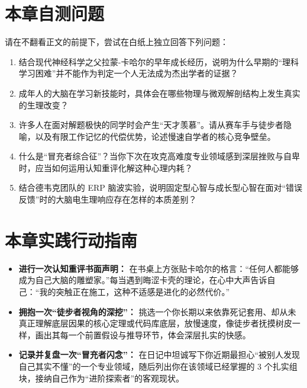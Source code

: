 \documentclass[12pt,a4paper,openany]{ctexbook}
\begin{document}
\section*{本章自测问题}
请在不翻看正文的前提下，尝试在白纸上独立回答下列问题：
\begin{enumerate}
    \item 结合现代神经科学之父拉蒙-卡哈尔的早年成长经历，说明为什么早期的“理科学习困难”并不能作为判定一个人无法成为杰出学者的证据？
    \item 成年人的大脑在学习新技能时，具体会在哪些物理与微观解剖结构上发生真实的生理改变？
    \item 许多人在面对解题极快的同学时会产生“天才羡慕”。请从赛车手与徒步者隐喻，以及有限工作记忆的代偿优势，论述慢速自学者的核心竞争壁垒。
    \item 什么是“冒充者综合征”？当你下次在攻克高难度专业领域感到深层挫败与自卑时，应当如何运用认知重评化解这种心理内耗？
    \item 结合德韦克团队的 ERP 脑波实验，说明固定型心智与成长型心智在面对“错误反馈”时的大脑电生理响应存在怎样的本质差别？
\end{enumerate}

\section*{本章实践行动指南}
\begin{practicebox}[本周心智模型重构清单]
\begin{itemize}
    \item[$\square$] \textbf{进行一次认知重评书面声明：} 在书桌上方张贴卡哈尔的格言：“任何人都能够成为自己大脑的雕塑家。”每当遇到晦涩卡壳的理论，在心中大声告诉自己：“我的突触正在施工，这种不适感是进化的必然代价。”
    \item[$\square$] \textbf{拥抱一次“徒步者视角的深挖”：} 挑选一个你长期以来依靠死记套用、却从未真正理解底层因果的核心定理或代码库底层，放慢速度，像徒步者抚摸树皮一样，画出其每一个前置假设与推导环节，体会深层扎实的快感。
    \item[$\square$] \textbf{记录并复盘一次“冒充者闪念”：} 在日记中坦诚写下你近期最担心“被别人发现自己其实不懂”的一个专业领域，随后列出你在该领域已经掌握的 3 个扎实组块，接纳自己作为“进阶探索者”的客观现状。
\end{itemize}
\end{practicebox}


\end{document}
